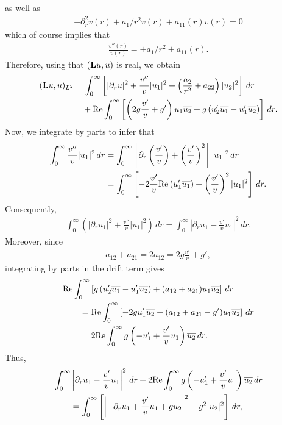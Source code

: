 \documentclass[11pt,reqno]{amsart}
\theoremstyle{remark}
\newcommand{\Lf}{\textup{\textbf{L}}}
\renewcommand{\Re}{\textup{Re}}
\theoremstyle{definition}
\begin{document}
as well as 
\begin{align*}
   - \partial_r^2 v(r)+a_1/r^2v(r)+a_{11}(r) v(r)=0
\end{align*}
which of course implies that  
\begin{align*}
\frac{v''(r)}{v(r)}=+a_1/r^2+a_{11}(r).
\end{align*}
Therefore, using that $(\Lf u,u)$ is real, we obtain
\begin{align*}
    (\Lf u,u)_{L^2}
    &=\int_0^\infty\left[
        |\partial_r u|^2
        +\frac{v''}{v}|u_1|^2
        +\left(\frac{a_2}{r^2}+a_{22}\right)|u_2|^2
    \right]\,dr\\
    &\quad+\Re\int_0^\infty\left[
        \left(2g\frac{v'}{v}+g'\right)u_1\overline{u_2}
        +g\left(u_2'\overline{u_1}-u_1'\overline{u_2}\right)
    \right]\,dr.
\end{align*}
Now, we integrate by parts to infer that
\begin{align*}
    \int_0^\infty\frac{v''}{v}|u_1|^2\,dr
    &=\int_0^\infty\left[
        \partial_r\left(\frac{v'}{v}\right)
        +\left(\frac{v'}{v}\right)^2
    \right]|u_1|^2\,dr\\
    &=\int_0^\infty\left[
        -2\frac{v'}{v}\Re\left(u_1'\overline{u_1}\right)
        +\left(\frac{v'}{v}\right)^2|u_1|^2
    \right]\,dr.
\end{align*}
Consequently,
\begin{align*}
    \int_0^\infty\left(
        |\partial_r u_1|^2+\frac{v''}{v}|u_1|^2
    \right)\,dr
    =\int_0^\infty
        \left|\partial_r u_1-\frac{v'}{v}u_1\right|^2\,dr.
\end{align*}
Moreover, since
\begin{align*}
    a_{12}+a_{21}=2a_{12}=2g\frac{v'}{v}+g',
\end{align*}
integrating by parts in the drift term gives
\begin{align*}
    &\Re\int_0^\infty\left[
        g\left(u_2'\overline{u_1}-u_1'\overline{u_2}\right)
        +(a_{12}+a_{21})u_1\overline{u_2}
    \right]\,dr\\
    &\qquad=\Re\int_0^\infty\left[
        -2g u_1'\overline{u_2}
        +(a_{12}+a_{21}-g')u_1\overline{u_2}
    \right]\,dr\\
    &\qquad=2\Re\int_0^\infty
        g\left(-u_1'+\frac{v'}{v}u_1\right)\overline{u_2}\,dr.
\end{align*}
Thus,
\begin{align*}
    &\int_0^\infty
        \left|\partial_r u_1-\frac{v'}{v}u_1\right|^2\,dr
      +2\Re\int_0^\infty
        g\left(-u_1'+\frac{v'}{v}u_1\right)\overline{u_2}\,dr\\
    &\qquad=\int_0^\infty\left[
        \left|-\partial_r u_1+\frac{v'}{v}u_1+g u_2\right|^2
        -g^2|u_2|^2
    \right]\,dr,
\end{align*}
\end{document}
